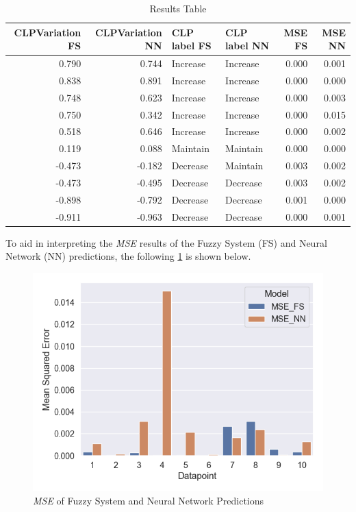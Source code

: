 \documentclass[titlepage]{article}
\begin{document}
\begin{table}[H]
    \centering
    \caption{Results Table}
    \label{tab:final_results}
    \begin{tabular}{rrllrr}
        \toprule
        CLPVariation FS & CLPVariation NN & CLP label FS & CLP label NN & MSE FS & MSE NN \\
        \midrule
        0.790           & 0.744           & Increase     & Increase     & 0.000  & 0.001  \\
        0.838           & 0.891           & Increase     & Increase     & 0.000  & 0.000  \\
        0.748           & 0.623           & Increase     & Increase     & 0.000  & 0.003  \\
        0.750           & 0.342           & Increase     & Increase     & 0.000  & 0.015  \\
        0.518           & 0.646           & Increase     & Increase     & 0.000  & 0.002  \\
        0.119           & 0.088           & Maintain     & Maintain     & 0.000  & 0.000  \\
        -0.473          & -0.182          & Decrease     & Maintain     & 0.003  & 0.002  \\
        -0.473          & -0.495          & Decrease     & Decrease     & 0.003  & 0.002  \\
        -0.898          & -0.792          & Decrease     & Decrease     & 0.001  & 0.000  \\
        -0.911          & -0.963          & Decrease     & Decrease     & 0.000  & 0.001  \\
        \bottomrule
    \end{tabular}
\end{table}

To aid in interpreting the \emph{MSE} results of the Fuzzy System (FS) and Neural Network (NN) predictions, the following \cref{fig:mse_fs_nn} is shown below.

\begin{figure}[H]
    \centering
    \includegraphics[scale=0.5]{../images/final_results/mse}
    \caption{\emph{MSE} of Fuzzy System and Neural Network Predictions}
    \label{fig:mse_fs_nn}
\end{figure}
\end{document}
